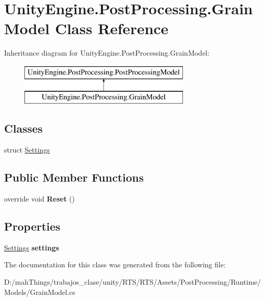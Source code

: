 \hypertarget{class_unity_engine_1_1_post_processing_1_1_grain_model}{}\section{Unity\+Engine.\+Post\+Processing.\+Grain\+Model Class Reference}
\label{class_unity_engine_1_1_post_processing_1_1_grain_model}
Inheritance diagram for Unity\+Engine.\+Post\+Processing.\+Grain\+Model\+:\begin{figure}[H]
\begin{center}
\leavevmode
\includegraphics[height=2.000000cm]{class_unity_engine_1_1_post_processing_1_1_grain_model}
\end{center}
\end{figure}
\subsection*{Classes}
\begin{DoxyCompactItemize}
\item 
struct \mbox{\hyperlink{struct_unity_engine_1_1_post_processing_1_1_grain_model_1_1_settings}{Settings}}
\end{DoxyCompactItemize}
\subsection*{Public Member Functions}
\begin{DoxyCompactItemize}
\item 
\mbox{\label{class_unity_engine_1_1_post_processing_1_1_grain_model_ab4dbacfe4c524d5e483285e361897d30}} 
override void {\bfseries Reset} ()
\end{DoxyCompactItemize}
\subsection*{Properties}
\begin{DoxyCompactItemize}
\item 
\mbox{\label{class_unity_engine_1_1_post_processing_1_1_grain_model_afbb518425ab6874c1578abf45f5bd1fb}} 
\mbox{\hyperlink{struct_unity_engine_1_1_post_processing_1_1_grain_model_1_1_settings}{Settings}} {\bfseries settings}
\end{DoxyCompactItemize}


The documentation for this class was generated from the following file\+:\begin{DoxyCompactItemize}
\item 
D\+:/mah\+Things/trabajos\+\_\+clase/unity/\+R\+T\+S/\+R\+T\+S/\+Assets/\+Post\+Processing/\+Runtime/\+Models/Grain\+Model.\+cs\end{DoxyCompactItemize}
